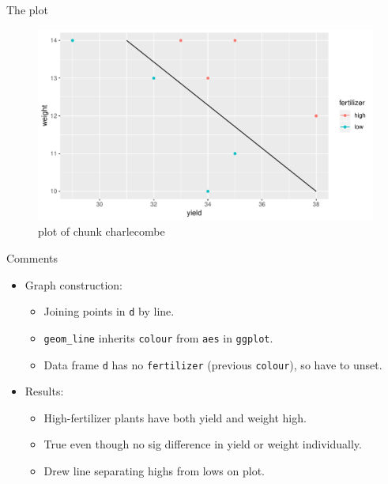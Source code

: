 \documentclass[ignorenonframetext,]{beamer}
\providecommand{\tightlist}{%
  \setlength{\itemsep}{0pt}\setlength{\parskip}{0pt}}
\begin{document}
\begin{frame}{The plot}
\protect\hypertarget{the-plot-6}{}

\begin{figure}
\centering
\includegraphics{figure/charlecombe-1.pdf}
\caption{plot of chunk charlecombe}
\end{figure}

\end{frame}

\begin{frame}[fragile]{Comments}
\protect\hypertarget{comments-18}{}

\begin{itemize}
\tightlist
\item
  Graph construction:

  \begin{itemize}
  \tightlist
  \item
    Joining points in \texttt{d} by line.
  \item
    \texttt{geom\_line} inherits \texttt{colour} from \texttt{aes} in
    \texttt{ggplot}.
  \item
    Data frame \texttt{d} has no \texttt{fertilizer} (previous
    \texttt{colour}), so have to unset.
  \end{itemize}
\item
  Results:

  \begin{itemize}
  \item
    High-fertilizer plants have both yield and weight high.
  \item
    True even though no sig difference in yield or weight individually.
  \item
    Drew line separating highs from lows on plot.
  \end{itemize}
\end{itemize}

\end{frame}
\end{document}
